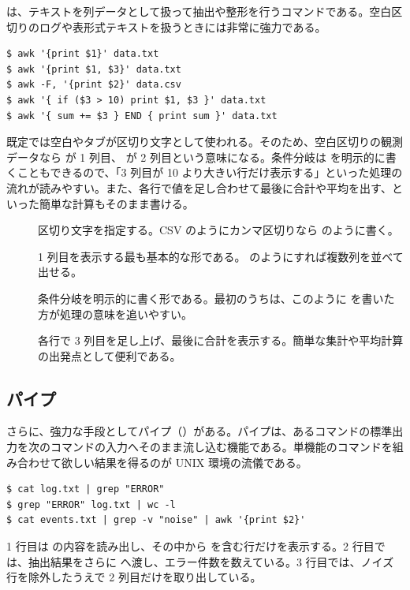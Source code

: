  は、テキストを列データとして扱って抽出や整形を行うコマンドである。空白区切りのログや表形式テキストを扱うときには非常に強力である。

\begin{lstlisting}[numbers=none, xleftmargin=2\zw]
$ awk '{print $1}' data.txt
$ awk '{print $1, $3}' data.txt
$ awk -F, '{print $2}' data.csv
$ awk '{ if ($3 > 10) print $1, $3 }' data.txt
$ awk '{ sum += $3 } END { print sum }' data.txt
\end{lstlisting}

既定では空白やタブが区切り文字として使われる。そのため、空白区切りの観測データなら  が 1 列目、 が 2 列目という意味になる。条件分岐は  を明示的に書くこともできるので、「3 列目が 10 より大きい行だけ表示する」といった処理の流れが読みやすい。また、各行で値を足し合わせて最後に合計や平均を出す、といった簡単な計算もそのまま書ける。

\begin{description}
\item[] 区切り文字を指定する。CSV のようにカンマ区切りなら  のように書く。
\item[] 1 列目を表示する最も基本的な形である。 のようにすれば複数列を並べて出せる。
\item[] 条件分岐を明示的に書く形である。最初のうちは、このように  を書いた方が処理の意味を追いやすい。
\item[] 各行で 3 列目を足し上げ、最後に合計を表示する。簡単な集計や平均計算の出発点として便利である。
\end{description}

\subsection{パイプ \code{|}}

さらに、強力な手段としてパイプ（\code{|}）がある。パイプは、あるコマンドの標準出力を次のコマンドの入力へそのまま流し込む機能である。単機能のコマンドを組み合わせて欲しい結果を得るのが UNIX 環境の流儀である。

\begin{lstlisting}[numbers=none, xleftmargin=2\zw]
$ cat log.txt | grep "ERROR"
$ grep "ERROR" log.txt | wc -l
$ cat events.txt | grep -v "noise" | awk '{print $2}'
\end{lstlisting}

1 行目は  の内容を読み出し、その中から  を含む行だけを表示する。2 行目では、抽出結果をさらに  へ渡し、エラー件数を数えている。3 行目では、ノイズ行を除外したうえで 2 列目だけを取り出している。

